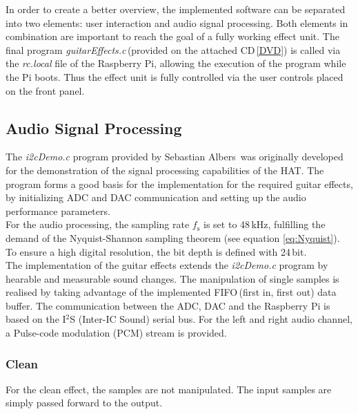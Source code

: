 In order to create a better overview, the implemented software can be separated into two elements: user interaction and audio signal processing. Both elements in combination are important to reach the goal of a fully working effect unit. The final program \textit{guitarEffects.c}\,(provided on the attached CD\,\ref{DVD}) is called via the \textit{rc.local} file of the Raspberry Pi, allowing the execution of the program while the Pi boots. Thus the effect unit is fully controlled via the user controls placed on the front panel.


\subsection{Audio Signal Processing}

The \textit{i2cDemo.c} program provided by Sebastian Albers\,\cite{Albers:2017} was originally developed for the demonstration of the signal processing capabilities of the HAT. The program forms a good basis for the implementation for the required guitar effects, by initializing ADC and DAC communication and setting up the audio performance parameters.\\
For the audio processing, the sampling rate $f_\mathrm{s}$ is set to 48\,kHz, fulfilling the demand of the Nyquist-Shannon sampling theorem (see equation \ref{eq:Nyquist}).
To ensure a high digital resolution, the bit depth is defined with 24\,bit.\\
The implementation of the guitar effects extends the \textit{i2cDemo.c} program by hearable and measurable sound changes. The manipulation of single samples is realised by taking advantage of the implemented FIFO\,(first in, first out) data buffer.
The communication between the ADC, DAC and the Raspberry Pi is based on the I$^2$S (Inter-IC Sound) serial bus.
For the left and right audio channel, a Pulse-code modulation (PCM) stream is provided.\\

\subsubsection{Clean}
For the clean effect, the samples are not manipulated. The input samples are simply passed forward to the output.  


